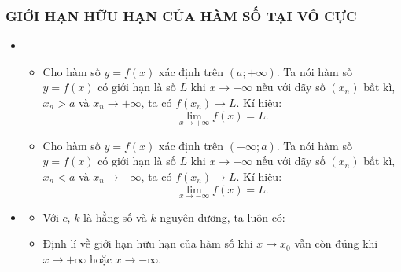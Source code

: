 \subsubsection{GIỚI HẠN HỮU HẠN CỦA HÀM SỐ TẠI VÔ CỰC}
\begin{itemize}
	\item [\iconMT] 
	\begin{itemize}
		\item Cho hàm số $y=f(x)$ xác định trên $\left({a;+\infty}\right) $. Ta nói hàm số $y=f(x)$ có giới hạn là số $L$ khi $x\to +\infty $ nếu với dãy số $\left({x_n}\right)$ bất kì, $x_n>a$ và $x_n\to +\infty $, ta có $f\left({x_n}\right)\to L $. Kí hiệu: $$\lim\limits_{x\to +\infty}f(x)=L. $$
		\item Cho hàm số $y=f(x)$ xác định trên $\left({-\infty;a}\right) $. Ta nói hàm số $y=f(x)$ có giới hạn là số $L$ khi $x\to -\infty $ nếu với dãy số $\left({x_n}\right)$ bất kì, $x_n<a$ và $x_n\to -\infty $, ta có $f\left({x_n}\right)\to L $. 
		Kí hiệu: $$\lim\limits_{x\to -\infty}f(x)=L. $$
	\end{itemize}
	\item [\iconMT]  
	\begin{gachsoc}
	\begin{itemize}
		\item  Với $c$, $k$ là hằng số và $k$ nguyên dương, ta luôn có:
	\item  Định lí về giới hạn hữu hạn của hàm số khi $x\to x_0$ vẫn còn đúng khi $x\to +\infty $ hoặc $x\to -\infty $.
\end{itemize}
\end{gachsoc}
\end{itemize}

